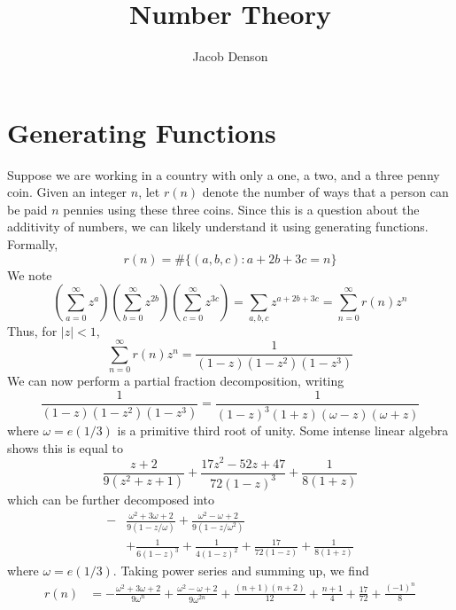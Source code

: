 

\title{Number Theory}
\author{Jacob Denson}




\maketitle

\tableofcontents


\chapter{Generating Functions}

\begin{example}
    Suppose we are working in a country with only a one, a two, and a three penny coin. Given an integer $n$, let $r(n)$ denote the number of ways that a person can be paid $n$ pennies using these three coins. Since this is a question about the additivity of numbers, we can likely understand it using generating functions. Formally,
    \[ r(n) = \# \{ (a,b,c): a + 2b + 3c = n \} \]
    We note
    \[ \left( \sum_{a = 0}^\infty z^a \right) \left( \sum_{b = 0}^\infty z^{2b} \right) \left( \sum_{c = 0}^\infty z^{3c} \right) = \sum_{a,b,c} z^{a + 2b + 3c} = \sum_{n = 0}^\infty r(n) z^n \]
    Thus, for $|z| < 1$,
    \[ \sum_{n = 0}^\infty r(n) z^n = \frac{1}{(1 - z)(1 - z^2)(1 - z^3)} \]
    We can now perform a partial fraction decomposition, writing
    \[ \frac{1}{(1-z)(1 - z^2)(1 - z^3)} = \frac{1}{(1-z)^3(1+z)(\omega - z)(\omega + z)} \]
    where $\omega = e(1/3)$ is a primitive third root of unity. Some intense linear algebra shows this is equal to
    \[ \frac{z + 2}{9(z^2 + z + 1)} + \frac{17 z^2 - 52 z + 47}{72 (1 - z)^3} + \frac{1}{8(1 + z)} \]
    which can be further decomposed into
    \begin{align*}
        - &\frac{\omega^2 + 3 \omega + 2}{9(1 - z/\omega)} + \frac{\omega^2 - \omega + 2}{9(1 - z/\omega^2)}\\
        &+ \frac{1}{6(1 - z)^3} + \frac{1}{4(1 - z)^2} + \frac{17}{72(1 - z)} + \frac{1}{8(1 + z)}
    \end{align*}
    where $\omega = e(1/3)$. Taking power series and summing up, we find
    \begin{align*}
        r(n) &= - \frac{\omega^2 + 3\omega + 2}{9 \omega^n} + \frac{\omega^2 - \omega + 2}{9 \omega^{2n}} + \frac{(n + 1)(n + 2)}{12} + \frac{n+1}{4} + \frac{17}{72} + \frac{(-1)^n}{8}\\

\end{align*}
\end{example}
